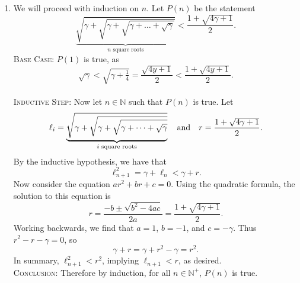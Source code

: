 \documentclass{article}
\begin{document}
\begin{enumerate}
        \vspace{2mm}
        \textbf{Important}: We have only disproved the validity of the proof, not of the claim. In fact, the famous mathematician Srinivasa Ramanujan first formulated this claim in 1911, and it was later proven to be true.
        \item We will proceed with induction on $n$. Let $P(n)$ be the statement $$\underbrace{\sqrt{\gamma + \sqrt{\gamma + \sqrt{\gamma + \dots + \sqrt{\gamma}}}}}_{\text{$n$ square roots}} < \frac{1 + \sqrt{4\gamma + 1}}{2}.$$
        \textsc{Base Case}: $P(1)$ is true, as $$\sqrt{\gamma} < \sqrt{\gamma + \tfrac{1}{4}} = \frac{\sqrt{4y + 1}}{2} < \frac{1 + \sqrt{4y + 1}}{2}.$$ \\
        \textsc{Inductive Step}: Now let $n \in \mathbb{N}$ such that $P(n)$ is true. Let $$\ell_{i} = \underbrace{\sqrt{\gamma + \sqrt{\gamma + \sqrt{\gamma + \dots + \sqrt{\gamma}}}}}_{\text{$i$ square roots}} \text{\quad and\quad} r = \frac{1 + \sqrt{4\gamma + 1}}{2}.$$ By the inductive hypothesis, we have that $$\ell_{n + 1}^{2} = \gamma + \ell_{n} < \gamma + r.$$ Now consider the equation $ar^{2} + br + c = 0.$ Using the quadratic formula, the solution to this equation is $$r = \frac{-b \pm \sqrt{b^{2} - 4ac}}{2a} = \frac{1 + \sqrt{4\gamma + 1}}{2}.$$ Working backwards, we find that $a = 1$, $b = -1$, and $c = -\gamma$. Thus $r^{2} - r - \gamma = 0$, so $$\gamma + r = \gamma + r^{2} - \gamma = r^{2}.$$ In summary, $\ell_{n + 1}^{2} < r^{2}$, implying $\ell_{n + 1} < r$, as desired. \\
        \textsc{Conclusion}: Therefore by induction, for all $n \in \mathbb{N}^{+}$, $P(n)$ is true.
    \end{enumerate}
\end{document}

